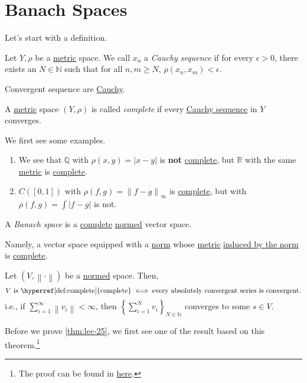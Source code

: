 \section{Banach Spaces}
Let's start with a definition.
\begin{definition}\label{def:Cauchy-sequence}
	Let \(Y, \rho \) be a \hyperref[def:metric]{metric} space. We call \(x_{n} \) a \emph{Cauchy sequence} if for every \(\epsilon >0\), there exists an
	\(N\in \mathbb{N} \) such that for all \(n, m\geq N\), \(\rho (x_{n} , x_{m} )< \epsilon \).
\end{definition}
\begin{note}
	Convergent sequence are \hyperref[def:Cauchy-sequence]{Cauchy}.
\end{note}

\begin{definition}[Complete]\label{def:complete}
	A \hyperref[def:metric]{metric} space \((Y, \rho )\) is called \emph{complete} if every \hyperref[def:Cauchy-sequence]{Cauchy sequence} in \(Y\) converges.
\end{definition}

\begin{eg}
	We first see some examples.
	\begin{enumerate}[(1)]
		\item We see that \(\mathbb{Q} \) with \(\rho (x, y) = \left\vert x - y \right\vert \) is \textbf{not} \hyperref[def:complete]{complete}, but \(\mathbb{R} \) with
		      the same \hyperref[def:metric]{metric} is \hyperref[def:complete]{complete}.
		\item \(C([0, 1])\) with \(\rho (f, g) = \left\lVert f-g\right\rVert _\infty \) is \hyperref[def:complete]{complete}, but with \(\rho (f, g) = \int \left\vert f-g \right\vert \) is not.
	\end{enumerate}
\end{eg}

\begin{definition}\label{def:Banach-space}
	A \emph{Banach space} is a \hyperref[def:complete]{complete} \hyperref[def:norm]{normed} vector space.
\end{definition}
\begin{remark}
	Namely, a vector space equipped with a \hyperref[def:norm]{norm} whose \hyperref[def:metric]{metric} \hyperref[induced-metric]{induced by the norm} is
	\hyperref[def:complete]{complete}.
\end{remark}

\begin{theorem}\label{thm:lec-25}
	Let \((V, \left\lVert \cdot\right\rVert )\) be a \hyperref[def:norm]{normed} space. Then,
	\[
		\text{\(V\) is \hyperref[def:complete]{complete}} \iff \text{every absolutely convergent series is convergent}.
	\]
	i.e., if \(\sum\limits_{i=1}^{\infty} \left\lVert v_{i} \right\rVert<\infty\), then \(\left\{\sum\limits_{i=1}^{N} v_{i} \right\}_{N\in \mathbb{N} }\)
	converges to some \(s\in V\).
\end{theorem}
Before we prove \autoref{thm:lec-25}, we first see one of the result based on this theorem.\footnote{The proof can be found in \hyperref[pf:thm:lec25]{here}.}

